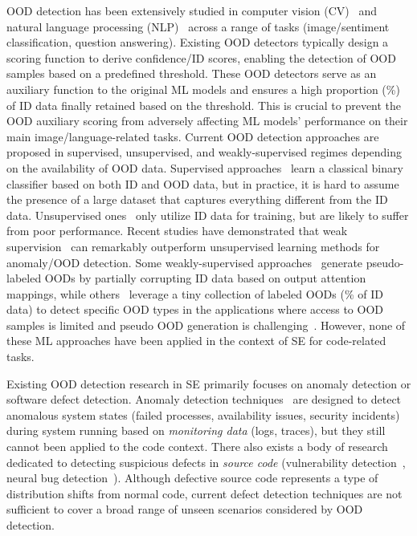 OOD detection has been extensively studied in computer vision (CV)~\cite{yang2021generalized} and natural language processing (NLP)~\cite{li2023survey} across a range of tasks (\eg image/sentiment classification, question answering). Existing OOD detectors typically design a scoring function to derive confidence/ID scores, enabling the detection of OOD samples based on a predefined threshold. These OOD detectors serve as an auxiliary function to the original ML models and ensures a high proportion (\%)~\cite{ming2022delving} of ID data finally retained based on the threshold. This is crucial to prevent the OOD auxiliary scoring from adversely affecting ML models' performance on their main image/language-related tasks. Current OOD detection approaches are proposed in supervised, unsupervised, and weakly-supervised regimes depending on the availability of OOD data. Supervised approaches~\cite{hendrycks2018deep} learn a classical binary classifier based on both ID and OOD data, but in practice, it is hard to assume the presence of a large dataset that captures everything different from the ID data. Unsupervised ones~\cite{mai2022self, zhou2021contrastive} only utilize ID data for training, but are likely to suffer from poor performance. Recent studies have demonstrated that weak supervision~\cite{tian2020few, majhi2021weakly, kim2023key, kim-etal-2023-pseudo} can remarkably outperform unsupervised learning methods for anomaly/OOD detection. Some weakly-supervised approaches~\cite{majhi2021weakly, kim2023key, kim-etal-2023-pseudo} generate pseudo-labeled OODs by partially corrupting ID data based on output attention mappings, while others~\cite{tian2020few} leverage a tiny collection of labeled OODs (\% of ID data) to detect specific OOD types in the applications where access to OOD samples is limited and pseudo OOD generation is challenging~\cite{yoo2022data}. However, none of these ML approaches have been applied in the context of SE for code-related tasks.

Existing OOD detection research in SE primarily focuses on anomaly detection or software defect detection. Anomaly detection techniques~\cite{le2022log, wang2023logonline, traces2020guo, traces2021liu} are designed to detect anomalous system states (\eg failed processes, availability issues, security incidents) during system running based on \textit{monitoring data} (\eg logs, traces), but they still cannot been applied to the code context. There also exists a body of research dedicated to detecting suspicious defects in \textit{source code} (\eg vulnerability detection~\cite{sejfia2024toward, steenhoek2024dataflow, vul2024cao}, neural bug detection~\cite{ allamanis2021self, he2022distribution}). Although defective source code represents a type of distribution shifts from normal code, current defect detection techniques are not sufficient to cover a broad range of unseen scenarios considered by OOD detection.

